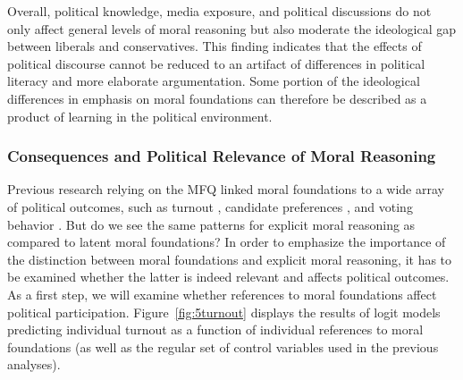 \documentclass[12pt]{article}
\begin{document}
Overall, political knowledge, media exposure, and political discussions do not only affect general levels of moral reasoning but also moderate the ideological gap between liberals and conservatives. This finding indicates that the effects of political discourse cannot be reduced to an artifact of differences in political literacy and more elaborate argumentation. Some portion of the ideological differences in emphasis on moral foundations can therefore be described as a product of learning in the political environment.


\subsubsection{Consequences and Political Relevance of Moral Reasoning}

Previous research relying on the MFQ linked moral foundations to a wide array of political outcomes, such as turnout \citep{johnson2014ideology}, candidate preferences \citep{iyer2010beyond}, and voting behavior \citep{franks2015using}. But do we see the same patterns for explicit moral reasoning as compared to latent moral foundations? In order to emphasize the importance of the distinction between moral foundations and explicit moral reasoning, it has to be examined whether the latter is indeed relevant and affects political outcomes. As a first step, we will examine whether references to moral foundations affect political participation. Figure~\ref{fig:5turnout} displays the results of logit models predicting individual turnout as a function of individual references to moral foundations (as well as the regular set of control variables used in the previous analyses).
\end{document}
